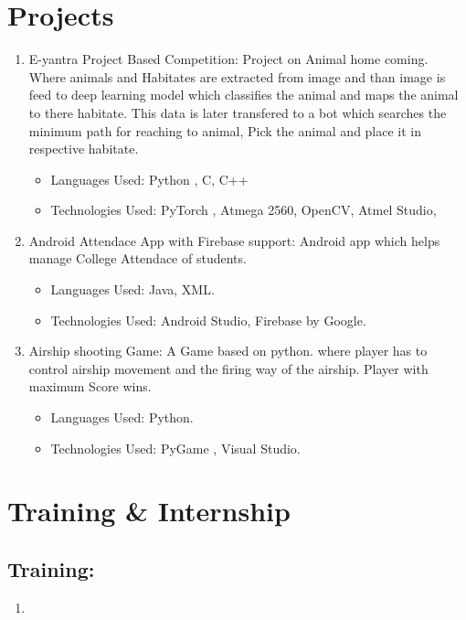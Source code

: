 \documentclass[10pt]{article}
\begin{document}
\section{Projects}
	\begin{enumerate}
		\item E-yantra Project Based Competition: Project on Animal home coming. Where animals and Habitates are extracted from image and than image is feed to deep learning model which classifies the animal and maps the animal to there habitate. This data is later transfered to a bot which searches the minimum path for reaching to animal, Pick the animal and place it in respective habitate.
			\begin{itemize}
			\item Languages Used: Python , C, C++
			\item Technologies Used: PyTorch , Atmega 2560, OpenCV, Atmel Studio, 
			
			\end{itemize}
		\item Android Attendace App with Firebase support: Android app which helps manage College Attendace of students.
			\begin{itemize}
			\item Languages Used: Java, XML.
			\item Technologies Used: Android Studio, Firebase by Google. 
			
			\end{itemize}
		\item Airship shooting Game:  A Game based on python.  where player has to control airship movement and the firing way of the airship. Player with maximum Score wins.
			\begin{itemize}
			\item Languages Used: Python.
			\item Technologies Used: PyGame , Visual Studio. 
			
			\end{itemize}
  
	\end{enumerate}


\section{Training \& Internship}
\subsection{Training:}
\begin{enumerate}
\item
\end{enumerate}
\end{document}
